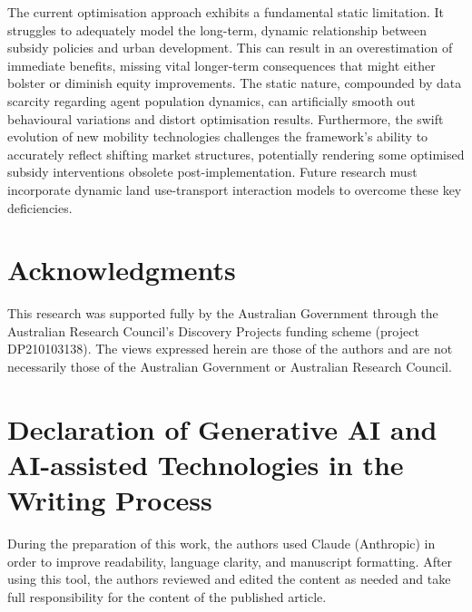 \documentclass[a4paper,fleqn]{cas-sc}
\begin{document}
The current optimisation approach exhibits a fundamental static limitation. It struggles to adequately model the long-term, dynamic relationship between subsidy policies and urban development. This can result in an overestimation of immediate benefits, missing vital longer-term consequences that might either bolster or diminish equity improvements. The static nature, compounded by data scarcity regarding agent population dynamics, can artificially smooth out behavioural variations and distort optimisation results. Furthermore, the swift evolution of new mobility technologies challenges the framework's ability to accurately reflect shifting market structures, potentially rendering some optimised subsidy interventions obsolete post-implementation. Future research must incorporate dynamic land use-transport interaction models to overcome these key deficiencies.

\section{Acknowledgments}

This research was supported fully by the Australian Government through the Australian Research Council's Discovery Projects funding scheme (project DP210103138). The views expressed herein are those of the authors and are not necessarily those of the Australian Government or Australian Research Council.

\section{Declaration of Generative AI and AI-assisted Technologies in the Writing Process}

During the preparation of this work, the authors used Claude (Anthropic) in order to improve readability, language clarity, and manuscript formatting. After using this tool, the authors reviewed and edited the content as needed and take full responsibility for the content of the published article.




\clearpage


\appendix
\renewcommand{\thepage}{A-\arabic{page}}
\setcounter{page}{1}


\fancypagestyle{appendixstyle}{%
  \fancyhf{}%
  \fancyfoot[C]{Page \thepage\ of \pageref{LastAppendixPage}}%
}


\pagestyle{appendixstyle}




\label{LastAppendixPage}
\end{document}
